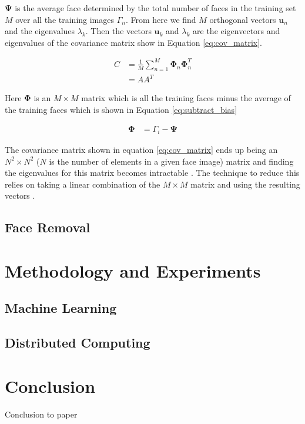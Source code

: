 \documentclass[
	submission,
	final,
	notitlepage,
	narroweqnarray,
	inline,
	twoside,
	]{ieee}
\begin{document}
$\mathbf{\Psi}$ is the average face determined by the total number of faces
in the training set $M$ over all the training images $\Gamma_n$. From 
here we find $M$ orthogonal vectors $\mathbf{u}_n$ and the eigenvalues
$\lambda_k$. Then the vectors $\mathbf{u}_k$ and $\lambda_k$ are the 
eigenvectors and eigenvalues of the covariance matrix show in Equation
\ref{eq:cov_matrix}.


\begin{align}
  C &= \frac{1}{M} \sum_{n=1}^M \mathbf{\Phi}_n \mathbf{\Phi}_n^T \label{eq:cov_matrix} \\
  &= AA^T
\end{align}

Here $\mathbf{\Phi}$ is an $M \times M$ matrix  which is all the 
training faces minus the average of the training faces which is
shown in Equation \ref{eq:subtract_bias}


\begin{align}
  \mathbf{\Phi} &= \Gamma_i - \mathbf{\Psi} \label{eq:subtract_bias}
\end{align}

The covariance matrix shown in equation \ref{eq:cov_matrix} ends up
being an $N^2 \times N^2$ ($N$ is the number of elements in a given 
face image) matrix and finding the eigenvalues for 
this matrix becomes intractable \cite{eigen_face_recognition}. The 
technique to reduce this relies on taking a linear combination of the 
$M \times M$ matrix and using the resulting vectors \cite{turk_eigen_faces}.

\subsection{Face Removal}


\section{Methodology and Experiments} 
\subsection{Machine Learning} 
\subsection{Distributed Computing}

\section{Conclusion}
\PARstart Conclusion to paper



\end{document}
